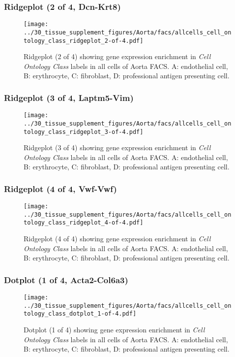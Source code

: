 \clearpage

\subsubsection{Ridgeplot (2 of 4, Dcn-Krt8)}
\begin{figure}[h]
\centering
\texttt{[image: ../30\_tissue\_supplement\_figures/Aorta/facs/allcells\_cell\_ontology\_class\_ridgeplot\_2-of-4.pdf]}

\caption{ Ridgeplot (2 of 4)  showing gene expression enrichment in \emph{Cell Ontology Class} labels in all cells of Aorta FACS. A: endothelial cell, B: erythrocyte, C: fibroblast, D: professional antigen presenting cell.}
\end{figure}


\clearpage

\subsubsection{Ridgeplot (3 of 4, Laptm5-Vim)}
\begin{figure}[h]
\centering
\texttt{[image: ../30\_tissue\_supplement\_figures/Aorta/facs/allcells\_cell\_ontology\_class\_ridgeplot\_3-of-4.pdf]}

\caption{ Ridgeplot (3 of 4)  showing gene expression enrichment in \emph{Cell Ontology Class} labels in all cells of Aorta FACS. A: endothelial cell, B: erythrocyte, C: fibroblast, D: professional antigen presenting cell.}
\end{figure}


\clearpage

\subsubsection{Ridgeplot (4 of 4, Vwf-Vwf)}
\begin{figure}[h]
\centering
\texttt{[image: ../30\_tissue\_supplement\_figures/Aorta/facs/allcells\_cell\_ontology\_class\_ridgeplot\_4-of-4.pdf]}

\caption{ Ridgeplot (4 of 4)  showing gene expression enrichment in \emph{Cell Ontology Class} labels in all cells of Aorta FACS. A: endothelial cell, B: erythrocyte, C: fibroblast, D: professional antigen presenting cell.}
\end{figure}


\clearpage

\subsubsection{Dotplot (1 of 4, Acta2-Col6a3)}
\begin{figure}[h]
\centering
\texttt{[image: ../30\_tissue\_supplement\_figures/Aorta/facs/allcells\_cell\_ontology\_class\_dotplot\_1-of-4.pdf]}

\caption{ Dotplot (1 of 4)  showing gene expression enrichment in \emph{Cell Ontology Class} labels in all cells of Aorta FACS. A: endothelial cell, B: erythrocyte, C: fibroblast, D: professional antigen presenting cell.}
\end{figure}


